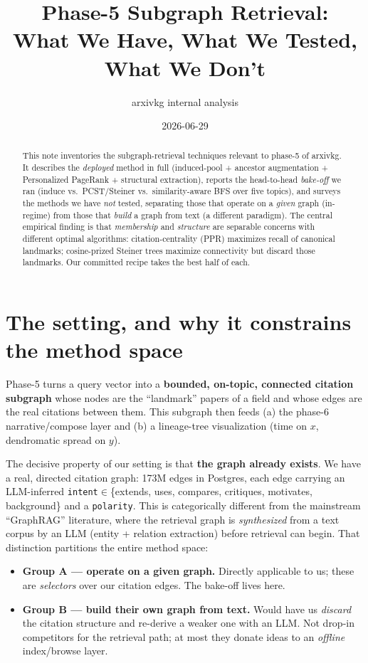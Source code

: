 \documentclass[11pt]{article}
\title{\vspace{-2.2em}\textbf{Phase-5 Subgraph Retrieval:\\What We Have, What We Tested, What We Don't}}
\author{arxivkg internal analysis}
\date{2026-06-29}
\newcommand{\code}[1]{\texttt{\small #1}}
\begin{document}
\maketitle
\thispagestyle{fancy}
\vspace{-1.5em}

\begin{abstract}\noindent
This note inventories the subgraph-retrieval techniques relevant to phase-5 of arxivkg. It
describes the \emph{deployed} method in full (induced-pool + ancestor augmentation + Personalized
PageRank + structural extraction), reports the head-to-head \emph{bake-off} we ran (induce vs.\
PCST/Steiner vs.\ similarity-aware BFS over five topics), and surveys the methods we have
\emph{not} tested, separating those that operate on a \emph{given} graph (in-regime) from those
that \emph{build} a graph from text (a different paradigm). The central empirical finding is that
\emph{membership} and \emph{structure} are separable concerns with different optimal algorithms:
citation-centrality (PPR) maximizes recall of canonical landmarks; cosine-prized Steiner trees
maximize connectivity but discard those landmarks. Our committed recipe takes the best half of
each.
\end{abstract}

\section{The setting, and why it constrains the method space}

Phase-5 turns a query vector into a \textbf{bounded, on-topic, connected citation subgraph} whose
nodes are the ``landmark'' papers of a field and whose edges are the real citations between them.
This subgraph then feeds (a) the phase-6 narrative/compose layer and (b) a lineage-tree
visualization (time on $x$, dendromatic spread on $y$).

The decisive property of our setting is that \textbf{the graph already exists}. We have a real,
directed citation graph: 173M edges in Postgres, each edge carrying an LLM-inferred
\code{intent}$\in$\{extends, uses, compares, critiques, motivates, background\} and a
\code{polarity}. This is categorically different from the mainstream ``GraphRAG'' literature,
where the retrieval graph is \emph{synthesized} from a text corpus by an LLM (entity + relation
extraction) before retrieval can begin. That distinction partitions the entire method space:

\begin{itemize}[leftmargin=1.4em,itemsep=2pt]
  \item \textbf{Group A --- operate on a given graph.} Directly applicable to us; these are
  \emph{selectors} over our citation edges. The bake-off lives here.
  \item \textbf{Group B --- build their own graph from text.} Would have us \emph{discard} the
  citation structure and re-derive a weaker one with an LLM. Not drop-in competitors for the
  retrieval path; at most they donate ideas to an \emph{offline} index/browse layer.
\end{itemize}
\end{document}
